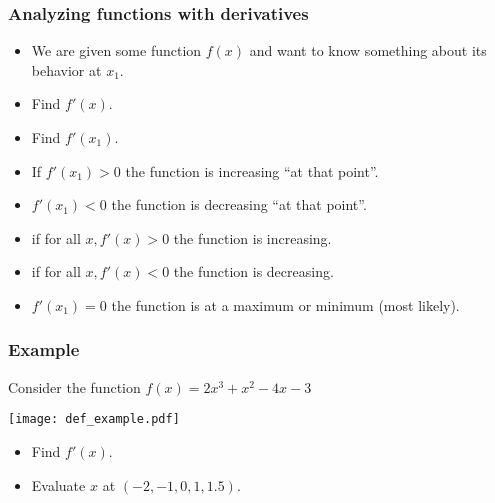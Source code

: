 \documentclass[xcolor=dvipsnames]{beamer} %
\begin{document}
\begin{frame}
\frametitle{Analyzing functions with derivatives}

\begin{itemize}
    \setlength\itemsep{1em}
\item We are given some function $f(x)$ and want to know something about its behavior at $x_1$.
\item Find $f'(x)$.
\item Find $f'(x_1)$.
\item If $f'(x_1) > 0$ the function is increasing ``at that point''.
\item $f'(x_1) < 0$ the function is decreasing ``at that point''.
\item if for all $x, f'(x) > 0$ the function is increasing.
\item if for all $x, f'(x) < 0$ the function is decreasing.
\item $f'(x_1) = 0$ the function is at a maximum or minimum (most likely). 
\end{itemize}
\end{frame}

\begin{frame}
\frametitle{Example}
Consider the function $f(x) = 2x^3 + x^2 - 4x - 3$

\begin{center}
\texttt{[image: def\_example.pdf]}
\end{center}

\begin{itemize}
\item Find $f'(x)$. 
\item Evaluate $x$ at $(-2, -1, 0, 1, 1.5)$.
\end{itemize}
\end{frame}
\end{document}
